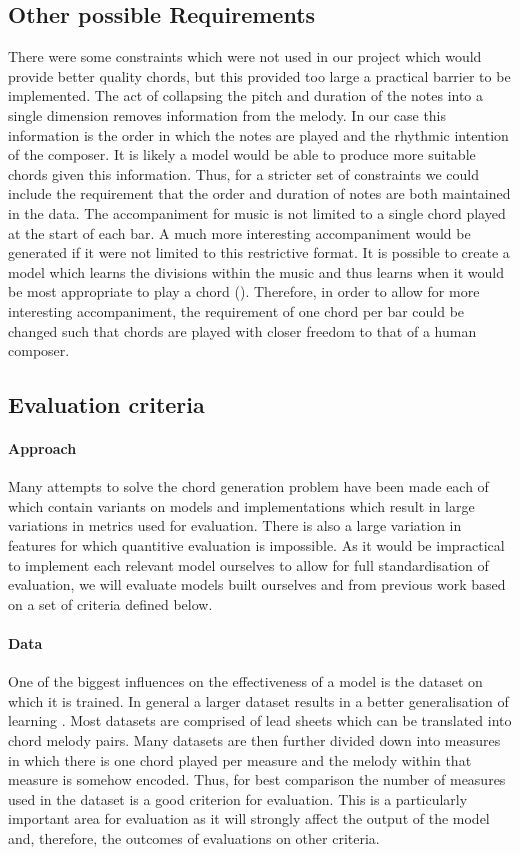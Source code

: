 \subsection{Other possible Requirements}

There were some constraints which were not used in our project which would provide better quality chords, but this provided too large a practical barrier to be implemented.
The act of collapsing the pitch and duration of the notes into a single dimension removes information from the melody.
In our case this information is the order in which the notes are played and the rhythmic intention of the composer.
It is likely a model would be able to produce more suitable chords given this information.
Thus, for a stricter set of constraints we could include the requirement that the order and duration of notes are both maintained in the data.
The accompaniment for music is not limited to a single chord played at the start of each bar.
A much more interesting accompaniment would be generated if it were not limited to this restrictive format.
It is possible to create a model which learns the divisions within the music and thus learns when it would be most appropriate to play a chord (\cite{ReinforcementLearning}).
Therefore, in order to allow for more interesting accompaniment, the requirement of one chord per bar could be changed such that chords are played with closer freedom to that of a human composer.

\subsection{Evaluation criteria}
\paragraph{Approach}
Many attempts to solve the chord generation problem have been made each of which contain variants on models and implementations which result in large variations in metrics used for evaluation.
There is also a large variation in features for which quantitive evaluation is impossible. 
As it would be impractical to implement each relevant model ourselves to allow for full standardisation of evaluation, we will evaluate models built ourselves and from previous work based on a set of criteria defined below.
\paragraph{Data}
One of the biggest influences on the effectiveness of a model is the dataset on which it is trained. 
In general a larger dataset results in a better generalisation of learning \cite{UnreasonableEffectivenessOfData}.
Most datasets are comprised of lead sheets which can be translated into chord melody pairs.
Many datasets are then further divided down into measures in which there is one chord played per measure and the melody within that measure is somehow encoded.
Thus, for best comparison the number of measures used in the dataset is a good criterion for evaluation.
This is a particularly important area for evaluation as it will strongly affect the output of the model and, therefore, the outcomes of evaluations on other criteria.

